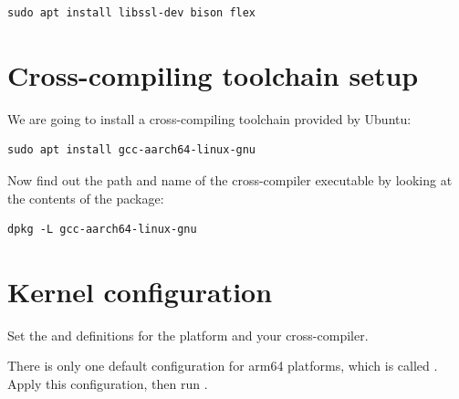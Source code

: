 \begin{verbatim}
sudo apt install libssl-dev bison flex
\end{verbatim}

\section{Cross-compiling toolchain setup}

We are going to install a cross-compiling toolchain provided by Ubuntu:

\begin{verbatim}
sudo apt install gcc-aarch64-linux-gnu
\end{verbatim}

Now find out the path and name of the cross-compiler executable by looking at the contents of the package:

\begin{verbatim}
dpkg -L gcc-aarch64-linux-gnu
\end{verbatim}

\section{Kernel configuration}

Set the  and  definitions for the 
platform and your cross-compiler.

There is only one default configuration for arm64 platforms, which is called
. Apply this configuration, then run .

